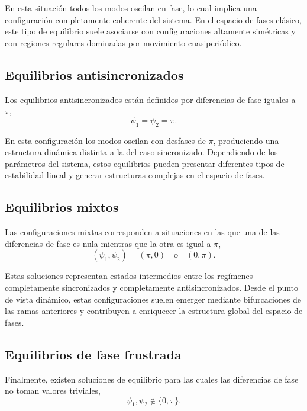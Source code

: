 En esta situación todos los modos oscilan en fase, lo cual implica una configuración completamente coherente del sistema. En el espacio de fases clásico, este tipo de equilibrio suele asociarse con configuraciones altamente simétricas y con regiones regulares dominadas por movimiento cuasiperiódico.

\subsection{Equilibrios antisincronizados}

Los equilibrios antisincronizados están definidos por diferencias de fase iguales a $\pi$,
\begin{equation}
    \psi_1 = \psi_2 = \pi.
\end{equation}

En esta configuración los modos oscilan con desfases de $\pi$, produciendo una estructura dinámica distinta a la del caso sincronizado. Dependiendo de los parámetros del sistema, estos equilibrios pueden presentar diferentes tipos de estabilidad lineal y generar estructuras complejas en el espacio de fases.

\subsection{Equilibrios mixtos}

Las configuraciones mixtas corresponden a situaciones en las que una de las diferencias de fase es nula mientras que la otra es igual a $\pi$,
\begin{equation}
    (\psi_1,\psi_2) = (\pi,0) \quad \text{o} \quad (0,\pi).
\end{equation}

Estas soluciones representan estados intermedios entre los regímenes completamente sincronizados y completamente antisincronizados. Desde el punto de vista dinámico, estas configuraciones suelen emerger mediante bifurcaciones de las ramas anteriores y contribuyen a enriquecer la estructura global del espacio de fases.

\subsection{Equilibrios de fase frustrada}

Finalmente, existen soluciones de equilibrio para las cuales las diferencias de fase no toman valores triviales,
\begin{equation}
    \psi_1, \psi_2 \notin \{0,\pi\}.
\end{equation}

